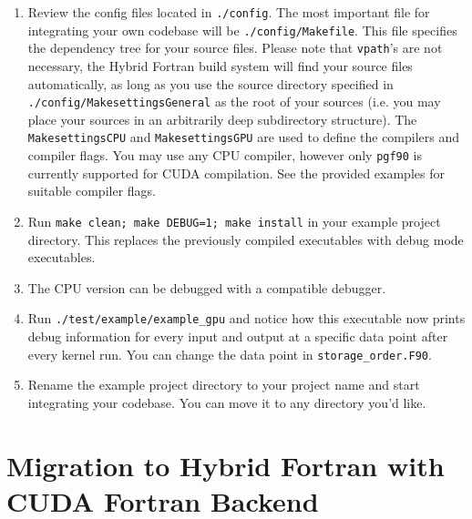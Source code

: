 {\begin{enumerate}
 \item Review the config files located in \verb|./config|. The most important file for integrating your own codebase will be \verb|./config/Makefile|. This file specifies the dependency tree for your source files. Please note that \verb|vpath|'s are not necessary, the Hybrid Fortran build system will find your source files automatically, as long as you use the source directory specified in \verb|./config/MakesettingsGeneral| as the root of your sources (i.e. you may place your sources in an arbitrarily deep subdirectory structure). The \verb|MakesettingsCPU| and \verb|MakesettingsGPU| are used to define the compilers and compiler flags. You may use any CPU compiler, however only \verb|pgf90| is currently supported for CUDA compilation. See the provided examples for suitable compiler flags.
 \item Run \verb|make clean; make DEBUG=1; make install| in your example project directory. This replaces the previously compiled executables with debug mode executables.
 \item The CPU version can be debugged with a compatible debugger.
 \item Run \verb|./test/example/example_gpu| and notice how this executable now prints debug information for every input and output at a specific data point after every kernel run. You can change the data point in \verb|storage_order.F90|.
 \item Rename the example project directory to your project name and start integrating your codebase. You can move it to any directory you'd like.
\end{enumerate}

\section{Migration to Hybrid Fortran with CUDA Fortran Backend}

}
